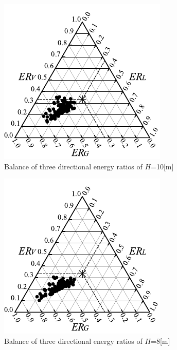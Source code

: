 \begin{figure}[H]
    \centering
    \includegraphics[keepaspectratio,scale=1.2]{05_att/reflect/rec_Ternary_out_10m.pdf}
    \caption{\hspace{1mm}Balance of three directional energy ratios of $H$=10[m]}
    \label{fig:sankaku10_r}
\end{figure}

\begin{figure}[H]
    \centering
    \includegraphics[keepaspectratio,scale=1.2]{05_att/reflect/rec_Ternary_out_8m.pdf}
    \caption{\hspace{1mm}Balance of three directional energy ratios of $H$=8[m]}
    \label{fig:sankaku8_r}
\end{figure}

